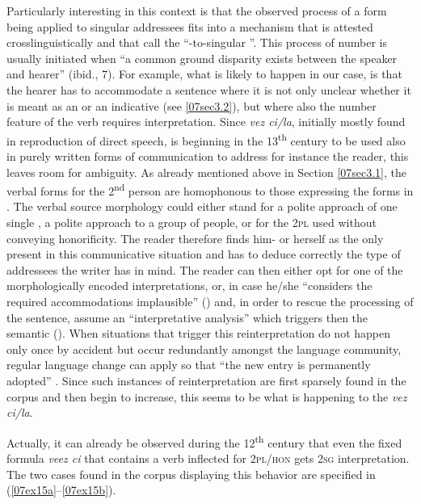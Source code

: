 \documentclass[output=paper,colorlinks,citecolor=brown]{langscibook}
\begin{document}
Particularly interesting in this context is that the observed process of a  form being applied to singular addressees fits into a mechanism that is attested crosslinguistically and that \citet{batesmckenzie2021} call the ``-to-singular  ''. This process of number  is usually initiated when ``a common ground disparity exists between the speaker and hearer'' (ibid., 7). For example, what is likely to happen in our case, is that the hearer has to accommodate a sentence where it is not only unclear whether it is meant as an  or an indicative (see \ref{07sec3.2}), but where also the number feature of the verb requires interpretation. Since \emph{vez ci/la}, initially mostly found in reproduction of direct speech, is beginning in the 13\textsuperscript{th} century to be used also in purely written forms of communication to address for instance the reader, this leaves room for ambiguity. As already mentioned above in Section \ref{07sec3.1}, the verbal forms for the 2\textsuperscript{nd} person  are homophonous to those expressing the  forms in . The verbal source morphology could either stand for a polite approach of one single , a polite approach to a group of people, or for the \textsc{2pl} used without conveying honorificity. The reader therefore finds him- or herself as the only  present in this communicative situation and has to deduce correctly the type of addressees the writer has in mind. The reader can then either opt for one of the morphologically encoded interpretations, or, in case he/she ``considers the required accommodations implausible'' (\citealt[2688]{eckardt2012}) and, in order to rescue the processing of the sentence, assume an ``interpretative analysis'' which triggers then the semantic  (\citealt[7]{batesmckenzie2021}). When situations that trigger this reinterpretation do not happen only once by accident but occur redundantly amongst the language community, regular language change can apply so that ``the new entry is permanently adopted'' \citep[2688]{eckardt2012}. Since such instances of reinterpretation are first sparsely found in the corpus and then begin to increase, this seems to be what is happening to the   \emph{vez ci/la}.

Actually, it can already be observed during the 12\textsuperscript{th} century that even the fixed formula \emph{veez ci} that contains a verb inflected for \textsc{2pl/hon} gets \textsc{2sg} interpretation. The two cases found in the corpus displaying this behavior are specified in (\ref{07ex15a}--\ref{07ex15b}).
\end{document}
